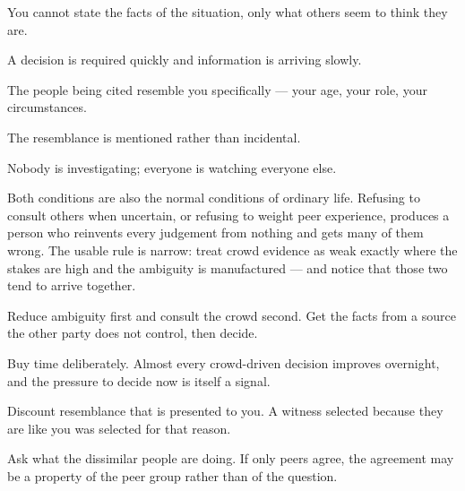 \begin{feedback}
  \item You cannot state the facts of the situation, only what others seem to think they are.
  \item A decision is required quickly and information is arriving slowly.
  \item The people being cited resemble you specifically --- your age, your role, your circumstances.
  \item The resemblance is mentioned rather than incidental.
  \item Nobody is investigating; everyone is watching everyone else.
\end{feedback}

\begin{failure}
Both conditions are also the normal conditions of ordinary life. Refusing to consult others when uncertain, or refusing to weight peer experience, produces a person who reinvents every judgement from nothing and gets many of them wrong. The usable rule is narrow: treat crowd evidence as weak exactly where the stakes are high and the ambiguity is manufactured --- and notice that those two tend to arrive together.
\end{failure}

\begin{countermeasures}
  \item Reduce ambiguity first and consult the crowd second. Get the facts from a source the other party does not control, then decide.
  \item Buy time deliberately. Almost every crowd-driven decision improves overnight, and the pressure to decide now is itself a signal.
  \item Discount resemblance that is presented to you. A witness selected because they are like you was selected for that reason.
  \item Ask what the dissimilar people are doing. If only peers agree, the agreement may be a property of the peer group rather than of the question.
\end{countermeasures}

\seesources
{}
